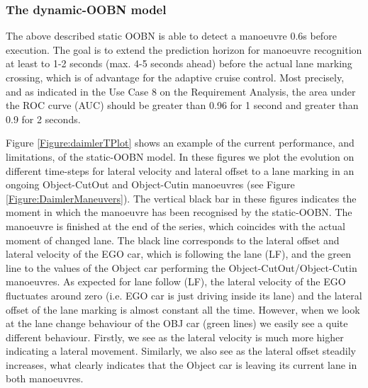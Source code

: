 \subsubsection*{The dynamic-OOBN model}

The above described static OOBN is able to detect a manoeuvre 0.6s before execution. The goal is to extend the prediction horizon for manoeuvre recognition at least to 1-2 seconds (max. 4-5 seconds ahead) before the actual lane marking crossing, which is of advantage for the adaptive cruise control. Most precisely, and as indicated in the Use Case 8 on the Requirement Analysis,  the area under the ROC curve (AUC) should be greater than 0.96 for 1 second and greater than 0.9 for 2 seconds.

Figure \ref{Figure:daimlerTPlot} shows an example of the current performance, and limitations, of the static-OOBN model. In these figures we plot the evolution on different time-steps for lateral velocity and lateral offset to a lane marking in an ongoing Object-CutOut and Object-Cutin manoeuvres (see Figure \ref{Figure:DaimlerManeuvers}). The vertical black bar in these figures indicates the moment in which the manoeuvre has been recognised by the static-OOBN. The manoeuvre is finished at the end of the series, which coincides with the actual moment of changed lane. The black line corresponds to the lateral offset and lateral velocity of the EGO car, which is following the lane (LF), and the green line to the values of the Object car performing the Object-CutOut/Object-Cutin manoeuvres. As expected for lane follow (LF), the lateral velocity of the EGO fluctuates around zero  (i.e. EGO car is just driving inside its lane) and the lateral offset of the lane marking is almost constant all the time. However, when we look at the lane change behaviour of the OBJ car (green lines) we easily see a quite different behaviour. Firstly, we see as the lateral velocity is much more higher indicating a lateral movement. Similarly, we also see as the lateral offset steadily increases, what clearly indicates that the Object car is leaving its current lane in both manoeuvres. 



